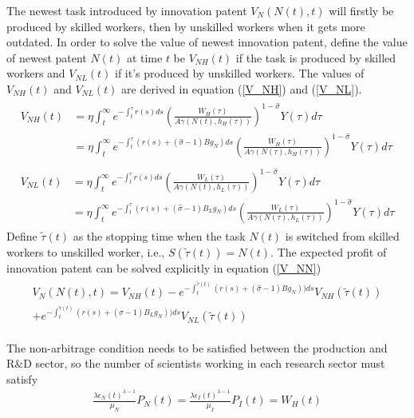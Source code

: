 \documentclass[12pt]{article}
\begin{document}
The newest task introduced by innovation patent $V_N(N(t),t)$ will firstly be produced by skilled workers, then by unskilled workers when it gets more outdated. In order to solve the value of newest innovation patent, define the value of newest patent $N(t)$ at time $t$ be $V_{NH}(t)$ if the task is produced by skilled workers and $V_{NL}(t)$ if it's produced by unskilled workers. The values of $V_{NH}(t)$ and $V_{NL}(t)$ are derived in equation (\ref{V_NH}) and (\ref{V_NL}). 
\begin{align}
\label{V_NH}
\begin{split}
V_{NH}(t) &= \eta\int_t^{\infty} e^{-\int_{t}^{\tau}r(s)ds}(\frac{W_H(\tau)}{A\gamma(N(t),h_H(\tau))})^{1-\hat{\sigma}}Y(\tau)d\tau \\
								&= \eta\int_t^{\infty} e^{-\int_{t}^{\tau}(r(s)+(\hat{\sigma}-1)Bg_N)ds}(\frac{W_H(\tau)}{A\gamma(N(\tau),h_H(\tau))})^{1-\hat{\sigma}}Y(\tau)d\tau
\end{split} \\
\label{V_NL}
\begin{split}
V_{NL}(t) &=\eta \int_t^{\infty} e^{-\int_{t}^{\tau}r(s)ds}(\frac{W_L(\tau)}{A\gamma(N(t),h_L(\tau))})^{1-\hat{\sigma}}Y(\tau)d\tau \\
								&= \eta \int_t^{\infty} e^{-\int_{t}^{\tau}(r(s)+(\hat{\sigma}-1)B_Lg_N)ds}(\frac{W_L(\tau)}{A\gamma(N(\tau),h_L(\tau))})^{1-\hat{\sigma}}Y(\tau)d\tau
\end{split}
\end{align}
Define $\tilde{\tau}(t)$ as the stopping time when the task $N(t)$ is switched from skilled workers to unskilled worker, i.e., $S(\tilde{\tau}(t)) = N(t)$. The expected profit of innovation patent can be solved explicitly in equation (\ref{V_NN})
\begin{align}
\label{V_NN}
\begin{split}
 V_N(N(t),t) = V_{NH}(t)-e^{-\int_{t}^{\tilde{\tau}(t)}(r(s)+(\hat{\sigma}-1)Bg_N))ds}V_{NH}(\tilde{\tau}(t)) \\
 +e^{-\int_{t}^{\tilde{\tau}(t)}(r(s)+(\hat{\sigma}-1)B_Lg_N))ds}V_{NL}(\tilde{\tau}(t)) 
 \end{split}
\end{align}

The non-arbitrage condition needs to be satisfied between the production and R\&D sector, so the number of scientists working in each research sector must satisfy
\begin{align*}
\frac{\lambda\epsilon_N(t)^{\lambda-1}}{\mu_N}P_N(t)= \frac{\lambda\epsilon_I(t)^{\lambda-1}}{\mu_I}P_I(t) = W_H(t)
\end{align*}
\end{document}
